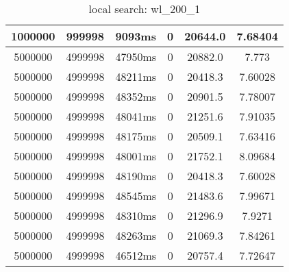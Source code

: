 \documentclass[./main.tex]{subfiles}
\begin{document}
\begin{table}
\begin{tabular}{ c | c | c | c | c | c }
        1000000 & 999998 & 9093ms & 0 & 20644.0 & 7.68404 \\
        \hline
        5000000 & 4999998 & 47950ms & 0 & 20882.0 & 7.773 \\
        5000000 & 4999998 & 48211ms & 0 & 20418.3 & 7.60028 \\
        \rowcolor{lightgray} 5000000 & 4999998 & 48352ms & 0 & 20901.5 & 7.78007 \\
        5000000 & 4999998 & 48041ms & 0 & 21251.6 & 7.91035 \\
        5000000 & 4999998 & 48175ms & 0 & 20509.1 & 7.63416 \\
        5000000 & 4999998 & 48001ms & 0 & 21752.1 & 8.09684 \\
        5000000 & 4999998 & 48190ms & 0 & 20418.3 & 7.60028 \\
        5000000 & 4999998 & 48545ms & 0 & 21483.6 & 7.99671 \\
        5000000 & 4999998 & 48310ms & 0 & 21296.9 & 7.9271 \\
        5000000 & 4999998 & 48263ms & 0 & 21069.3 & 7.84261 \\
        5000000 & 4999998 & 46512ms & 0 & 20757.4 & 7.72647 \\
    \end{tabular}
    \caption{local search: wl\_200\_1}
\end{table}
\end{document}
